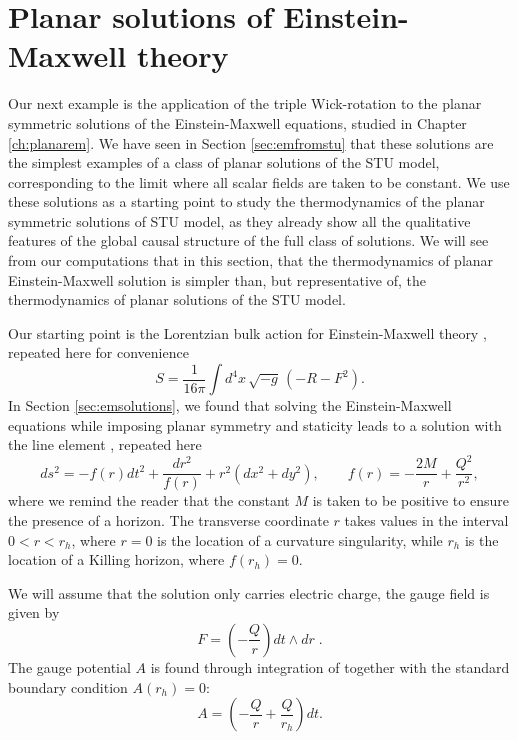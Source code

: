 \section{Planar solutions of Einstein-Maxwell theory}
\label{sec:thermopem}

Our next example is the application of the triple Wick-rotation to the planar symmetric solutions of the Einstein-Maxwell equations, studied in Chapter \ref{ch:planarem}. We have seen in Section \ref{sec:emfromstu} that these solutions are the simplest examples of a class of planar solutions of the STU model, corresponding to the limit where all scalar fields are taken to be constant. We use these solutions as a starting point to study the thermodynamics of the planar symmetric solutions of STU model, as they already show all the qualitative features of the global causal structure of the full class of solutions. We will see from our computations that in this section, that the thermodynamics of planar Einstein-Maxwell solution is simpler than, but representative of, the thermodynamics of planar solutions of the STU model. 

Our starting point is the Lorentzian bulk action for Einstein-Maxwell theory , repeated here for convenience 
\begin{equation*}    
        S  = \frac{1}{16\pi} \int d^4x \, \sqrt{-g} \,  \left( - R - F^2\right) .
\end{equation*}
In Section \ref{sec:emsolutions}, we found that solving the Einstein-Maxwell equations while imposing planar symmetry and staticity leads to a solution with the line element , repeated here
\begin{equation*}
    ds^2 = -f(r) dt^2 + \frac{dr^2}{f(r)} + r^2 (dx^2 + dy^2), \qquad f(r) = -\frac{2M}{r} + \frac{Q^2}{r^2},
\end{equation*}
where we remind the reader that the constant $M$ is taken to be positive to ensure the presence of a horizon. The transverse coordinate $r$ takes values in the interval $0 < r < r_h$, where $r=0$ is the location of a curvature singularity, while $r_h$ is the location of a  Killing horizon, where  $f(r_h) = 0$. 

We will assume that the solution only carries electric charge, the gauge field is given by
\begin{equation}
\label{eq:gaugefield}
    F = \left( - \frac{Q}{r} \right) dt \wedge dr\;.
\end{equation}
The gauge potential $A$ is found through integration of  together with the standard boundary condition $A(r_h) = 0$:
\begin{equation}
\label{eq:gaugepotential}
    A = \left(- \frac{Q}{r} + \frac{Q}{r_h} \right) dt.
\end{equation}

